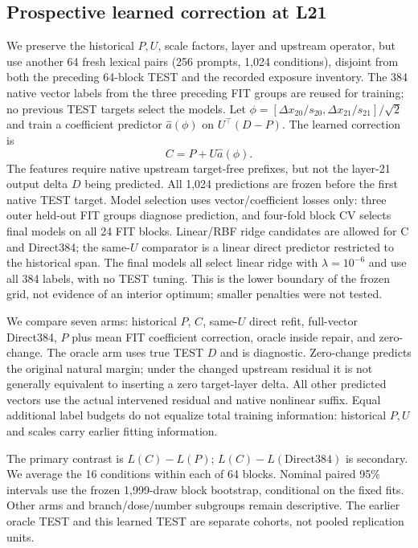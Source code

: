 \subsection{Prospective learned correction at L21}\label{sec:learneddesign}
We preserve the historical $P,U$, scale factors, layer and upstream operator, but use another 64 fresh lexical pairs (256 prompts, 1,024 conditions), disjoint from both the preceding 64-block TEST and the recorded exposure inventory. The 384 native vector labels from the three preceding FIT groups are reused for training; no previous TEST targets select the models. Let $\phi=[\Delta x_{20}/s_{20},\Delta x_{21}/s_{21}]/\sqrt2$ and train a coefficient predictor $\widehat a(\phi)$ on $U^\top(D-P)$. The learned correction is
\[
 C=P+U\widehat a(\phi).
\]
The features require native upstream target-free prefixes, but not the layer-21 output delta $D$ being predicted. All 1,024 predictions are frozen before the first native TEST target. Model selection uses vector/coefficient losses only: three outer held-out FIT groups diagnose prediction, and four-fold block CV selects final models on all 24 FIT blocks. Linear/RBF ridge candidates are allowed for C and Direct384; the same-$U$ comparator is a linear direct predictor restricted to the historical span. The final models all select linear ridge with $\lambda=10^{-6}$ and use all 384 labels, with no TEST tuning. This is the lower boundary of the frozen grid, not evidence of an interior optimum; smaller penalties were not tested.

We compare seven arms: historical $P$, $C$, same-$U$ direct refit, full-vector Direct384, $P$ plus mean FIT coefficient correction, oracle inside repair, and zero-change. The oracle arm uses true TEST $D$ and is diagnostic. Zero-change predicts the original natural margin; under the changed upstream residual it is not generally equivalent to inserting a zero target-layer delta. All other predicted vectors use the actual intervened residual and native nonlinear suffix. Equal additional label budgets do not equalize total training information: historical $P,U$ and scales carry earlier fitting information.

The primary contrast is $L(C)-L(P)$; $L(C)-L(\mathrm{Direct384})$ is secondary. We average the 16 conditions within each of 64 blocks. Nominal paired 95\% intervals use the frozen 1,999-draw block bootstrap, conditional on the fixed fits. Other arms and branch/dose/number subgroups remain descriptive. The earlier oracle TEST and this learned TEST are separate cohorts, not pooled replication units.

